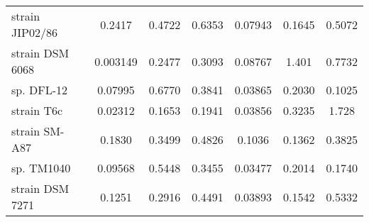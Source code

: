 \begin{landscape}
\begin{table}
\begin{tabular}{lS[table-format=2.5]S[table-format=2.5]S[table-format=2.5]S[table-format=2.5]S[table-format=2.5]S[table-format=2.5]}
 strain JIP02/86 & 0.2417 & 0.4722 & 0.6353 & 0.07943 & 0.1645 & 0.5072\\
 strain DSM 6068 & 0.003149 & 0.2477 & 0.3093 & 0.08767 & 1.401 & 0.7732\\
 sp. DFL-12 & 0.07995 & 0.6770 & 0.3841 & 0.03865 & 0.2030 & 0.1025\\
 strain T6c & 0.02312 & 0.1653 & 0.1941 & 0.03856 & 0.3235 & 1.728\\
 strain SM-A87 & 0.1830 & 0.3499 & 0.4826 & 0.1036 & 0.1362 & 0.3825\\
 sp. TM1040 & 0.09568 & 0.5448 & 0.3455 & 0.03477 & 0.2014 & 0.1740\\
 strain DSM 7271 & 0.1251 & 0.2916 & 0.4491 & 0.03893 & 0.1542 & 0.5332\\
\bottomrule
\end{tabular}
\end{table}
\end{landscape}
